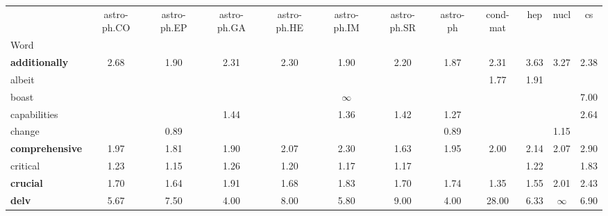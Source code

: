 \begin{tabular}{|l|c|c|c|c|c|c|c|c|c|c|c|}
\toprule
 & astro-ph.CO & astro-ph.EP & astro-ph.GA & astro-ph.HE & astro-ph.IM & astro-ph.SR & astro-ph & cond-mat & hep & nucl & cs \\
Word &  &  &  &  &  &  &  &  &  &  &  \\
\midrule
\textbf{additionally} & \cellcolor{green!55} 2.68 & \cellcolor{green!35} 1.90 & \cellcolor{green!46} 2.31 & \cellcolor{green!46} 2.30 & \cellcolor{green!35} 1.90 & \cellcolor{green!44} 2.20 & \cellcolor{green!34} 1.87 & \cellcolor{green!46} 2.31 & \cellcolor{green!71} 3.63 & \cellcolor{green!66} 3.27 & \cellcolor{green!48} 2.38 \\
albeit &  &  &  &  &  &  &  & \cellcolor{green!31} 1.77 & \cellcolor{green!36} 1.91 &  &  \\
boast &  &  &  &  & \cellcolor{green!100} $\infty$ &  &  &  &  &  & \cellcolor{green!100} 7.00 \\
capabilities &  &  & \cellcolor{green!20} 1.44 &  & \cellcolor{green!17} 1.36 & \cellcolor{green!19} 1.42 & \cellcolor{green!13} 1.27 &  &  &  & \cellcolor{green!54} 2.64 \\
change &  & \cellcolor{red!22} 0.89 &  &  &  &  & \cellcolor{red!22} 0.89 &  &  & \cellcolor{green!7} 1.15 &  \\
\textbf{comprehensive} & \cellcolor{green!37} 1.97 & \cellcolor{green!33} 1.81 & \cellcolor{green!35} 1.90 & \cellcolor{green!40} 2.07 & \cellcolor{green!46} 2.30 & \cellcolor{green!27} 1.63 & \cellcolor{green!37} 1.95 & \cellcolor{green!38} 2.00 & \cellcolor{green!42} 2.14 & \cellcolor{green!40} 2.07 & \cellcolor{green!59} 2.90 \\
critical & \cellcolor{green!11} 1.23 & \cellcolor{green!7} 1.15 & \cellcolor{green!12} 1.26 & \cellcolor{green!10} 1.20 & \cellcolor{green!8} 1.17 & \cellcolor{green!8} 1.17 &  &  & \cellcolor{green!11} 1.22 &  & \cellcolor{green!33} 1.83 \\
\textbf{crucial} & \cellcolor{green!29} 1.70 & \cellcolor{green!27} 1.64 & \cellcolor{green!36} 1.91 & \cellcolor{green!28} 1.68 & \cellcolor{green!33} 1.83 & \cellcolor{green!29} 1.70 & \cellcolor{green!30} 1.74 & \cellcolor{green!16} 1.35 & \cellcolor{green!24} 1.55 & \cellcolor{green!38} 2.01 & \cellcolor{green!49} 2.43 \\
\textbf{delv} & \cellcolor{green!96} 5.67 & \cellcolor{green!100} 7.50 & \cellcolor{green!77} 4.00 & \cellcolor{green!100} 8.00 & \cellcolor{green!98} 5.80 & \cellcolor{green!100} 9.00 & \cellcolor{green!77} 4.00 & \cellcolor{green!100} 28.00 & \cellcolor{green!100} 6.33 & \cellcolor{green!100} $\infty$ & \cellcolor{green!100} 6.90 \\

\end{tabular}
